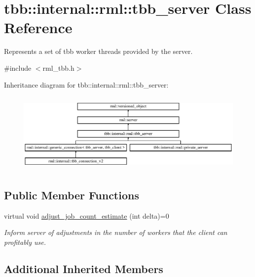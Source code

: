 \hypertarget{classtbb_1_1internal_1_1rml_1_1tbb__server}{}\section{tbb\+:\+:internal\+:\+:rml\+:\+:tbb\+\_\+server Class Reference}
\label{classtbb_1_1internal_1_1rml_1_1tbb__server}


Represents a set of tbb worker threads provided by the server.  




{\ttfamily \#include $<$rml\+\_\+tbb.\+h$>$}

Inheritance diagram for tbb\+:\+:internal\+:\+:rml\+:\+:tbb\+\_\+server\+:\begin{figure}[H]
\begin{center}
\leavevmode
\includegraphics[height=3.988604cm]{classtbb_1_1internal_1_1rml_1_1tbb__server}
\end{center}
\end{figure}
\subsection*{Public Member Functions}
\begin{DoxyCompactItemize}
\item 
\hypertarget{classtbb_1_1internal_1_1rml_1_1tbb__server_a2b1c4f0f5ea896049358318f2927cd6f}{}virtual void \hyperlink{classtbb_1_1internal_1_1rml_1_1tbb__server_a2b1c4f0f5ea896049358318f2927cd6f}{adjust\+\_\+job\+\_\+count\+\_\+estimate} (int delta)=0\label{classtbb_1_1internal_1_1rml_1_1tbb__server_a2b1c4f0f5ea896049358318f2927cd6f}

\begin{DoxyCompactList}\small\item\em Inform server of adjustments in the number of workers that the client can profitably use. \end{DoxyCompactList}\end{DoxyCompactItemize}
\subsection*{Additional Inherited Members}


